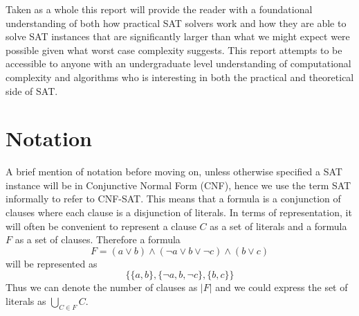 Taken as a whole this report will provide the reader with a foundational understanding
of both how practical SAT solvers work and how they are able
to solve SAT instances that are significantly larger than what we might expect were possible
given what worst case complexity suggests. This report attempts to be accessible
to anyone with an undergraduate level understanding of computational complexity and algorithms
who is interesting in both the practical and theoretical side of SAT.


\section{Notation}

A brief mention of notation before moving on, unless otherwise specified
a SAT instance will be in Conjunctive Normal Form (CNF), hence
we use the term SAT informally to refer to CNF-SAT. This means that
a formula is a conjunction of clauses where each clause is a disjunction of literals.
In terms of representation, it will often be convenient to represent a clause
$C$ as a set of literals and a formula $F$ as a set of clauses.
Therefore a formula
\begin{equation*}
    F = (a \lor b) \land (\neg a \lor b \lor \neg c) \land (b \lor c)
\end{equation*}
will be represented as
\begin{equation*}
    \{\{a, b\},\{\neg a, b, \neg c\}, \{b, c\}\}
\end{equation*}
Thus we can denote the number of clauses as $|F|$ and we could
express the set of literals as $\bigcup_{C \in F}C$.

